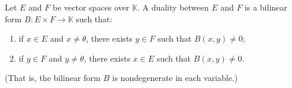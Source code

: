 Let $E$ and $F$ be vector spaces over $\mathbb{K}$. A duality between $E$ and $F$ is a bilinear form $B: E \times F \to \mathbb{K}$ such that:
\begin{enumerate}
\item[(i)] if $x \in E$ and $x \neq \theta$, there exists $y \in F$ such that $B(x, y) \neq 0$;
\item[(ii)] if $y \in F$ and $y \neq \theta$, there exists $x \in E$ such that $B(x, y) \neq 0$.
\end{enumerate}
(That is, the bilinear form $B$ is nondegenerate in each variable.)
